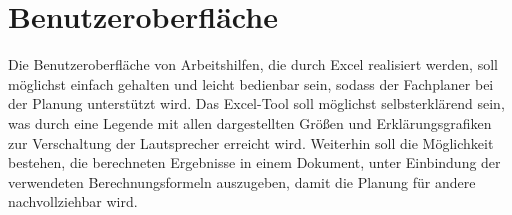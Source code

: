 \section{Benutzeroberfläche}
\label{sec:Benutzeroberflaeche}
Die Benutzeroberfläche von Arbeitshilfen, die durch Excel realisiert werden, soll möglichst einfach gehalten und leicht bedienbar sein, sodass der Fachplaner bei der Planung unterstützt wird. Das Excel-Tool soll möglichst selbsterklärend sein, was durch eine Legende mit allen dargestellten Größen und Erklärungsgrafiken zur Verschaltung der Lautsprecher erreicht wird. Weiterhin soll die Möglichkeit bestehen, die berechneten Ergebnisse in einem Dokument, unter Einbindung der verwendeten Berechnungsformeln auszugeben, damit die Planung für andere nachvollziehbar wird.
